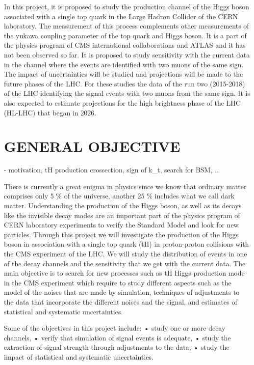 \documentclass[final,3p]{CSP}
\begin{document}
In this project, it is proposed to study the production channel of the Higgs boson associated with a single top quark in the Large 
Hadron Collider of the CERN laboratory. The measurement of this process complements other measurements of the yukawa coupling parameter 
of the top quark and Higgs boson. It is a part of the physics program of CMS international collaborations and ATLAS and it has not been 
observed so far. It is proposed to study sensitivity with the current data in the channel where the events are identified with two muons 
of the same sign. The impact of uncertainties will be studied and projections will be made to the future phases of the LHC. For these 
studies the data of the run two (2015-2018) of the LHC identifying the signal events with two muons from the same sign. It is also 
expected to estimate projections for the high brightness phase of the LHC (HL-LHC) that began in 2026.

\section{GENERAL OBJECTIVE}
- motivation, tH production crossection, sign of k_t, search for BSM, ..

There is currently a great enigma in physics since we know that ordinary matter comprises only 5 \% of the universe, another 
25 \% includes what we call dark matter. Understanding the production of the Higgs boson, as well as its decays like the invisible 
decay modes are an important part of the physics program of CERN laboratory experiments to verify the Standard Model and look for new 
particles. Through this project we will investigate the production of the Higgs boson in association with a single top quark (tH) 
in proton-proton collisions with the CMS experiment of the LHC. We will study the distribution of events in one of the decay channels and the sensitivity that we get with the current data. The main objective is to search for new processes such as tH Higgs production mode in the CMS experiment which require to study different aspects such as the model of the noises that are made by simulation, techniques of adjustments to the data that incorporate the different noises and the signal, and estimates of statistical and systematic uncertainties.

Some of the objectives in this project include:
• study one or more decay channels,
• verify that simulation of signal events is adequate,
• study the extraction of signal strength through adjustments to the data,
• study the impact of statistical and systematic uncertainties.
\end{document}
